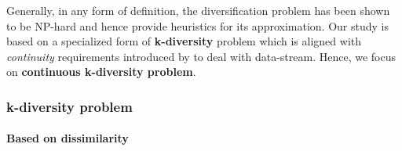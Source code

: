 \documentclass[a4paper,12pt,oneside]{book}
\theoremstyle{definition}
\theoremstyle{remark}
\begin{document}
Generally, in any form of definition, the diversification problem has been shown to be NP-hard \cite{Drosou2009} and hence provide heuristics for its approximation. Our study is based on a specialized form of \textbf{k-diversity} problem which is aligned with \emph{continuity} requirements introduced by \cite{Drosou2014ExtendedDiversity} to deal with data-stream. Hence, we focus on \textbf{continuous k-diversity problem}.


\subsubsection{k-diversity problem}

\paragraph{Based on dissimilarity}
\end{document}

